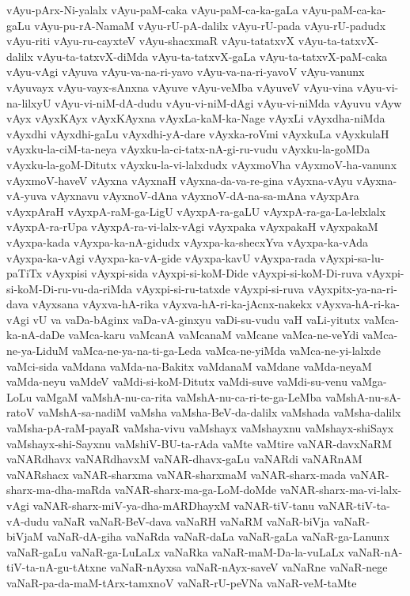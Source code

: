 {vAyu-pArx-Ni-yalalx
vAyu-paM-caka
vAyu-paM-ca-ka-gaLa
vAyu-paM-ca-ka-gaLu
vAyu-pu-rA-NamaM
vAyu-rU-pA-dalilx
vAyu-rU-pada
vAyu-rU-padudx
vAyu-riti
vAyu-ru-cayxteV
vAyu-shacxmaR
vAyu-tatatxvX
vAyu-ta-tatxvX-dalilx
vAyu-ta-tatxvX-diMda
vAyu-ta-tatxvX-gaLa
vAyu-ta-tatxvX-paM-caka
vAyu-vAgi
vAyuva
vAyu-va-na-ri-yavo
vAyu-va-na-ri-yavoV
vAyu-vanunx
vAyuvayx
vAyu-vayx-sAnxna
vAyuve
vAyu-veMba
vAyuveV
vAyu-vina
vAyu-vi-na-lilxyU
vAyu-vi-niM-dA-dudu
vAyu-vi-niM-dAgi
vAyu-vi-niMda
vAyuvu
vAyw
vAyx
vAyxKAyx
vAyxKAyxna
vAyxLa-kaM-ka-Nage
vAyxLi
vAyxdha-niMda
vAyxdhi
vAyxdhi-gaLu
vAyxdhi-yA-dare
vAyxka-roVmi
vAyxkuLa
vAyxkulaH
vAyxku-la-ciM-ta-neya
vAyxku-la-ci-tatx-nA-gi-ru-vudu
vAyxku-la-goMDa
vAyxku-la-goM-Ditutx
vAyxku-la-vi-lalxdudx
vAyxmoVha
vAyxmoV-ha-vanunx
vAyxmoV-haveV
vAyxna
vAyxnaH
vAyxna-da-va-re-gina
vAyxna-vAyu
vAyxna-vA-yuva
vAyxnavu
vAyxnoV-dAna
vAyxnoV-dA-na-sa-mAna
vAyxpAra
vAyxpAraH
vAyxpA-raM-ga-LigU
vAyxpA-ra-gaLU
vAyxpA-ra-ga-La-lelxlalx
vAyxpA-ra-rUpa
vAyxpA-ra-vi-lalx-vAgi
vAyxpaka
vAyxpakaH
vAyxpakaM
vAyxpa-kada
vAyxpa-ka-nA-gidudx
vAyxpa-ka-shecxYva
vAyxpa-ka-vAda
vAyxpa-ka-vAgi
vAyxpa-ka-vA-gide
vAyxpa-kavU
vAyxpa-rada
vAyxpi-sa-lu-paTiTx
vAyxpisi
vAyxpi-sida
vAyxpi-si-koM-Dide
vAyxpi-si-koM-Di-ruva
vAyxpi-si-koM-Di-ru-vu-da-riMda
vAyxpi-si-ru-tatxde
vAyxpi-si-ruva
vAyxpitx-ya-na-ri-dava
vAyxsana
vAyxva-hA-rika
vAyxva-hA-ri-ka-jAcnx-nakekx
vAyxva-hA-ri-ka-vAgi
vU
va
vaDa-bAginx
vaDa-vA-ginxyu
vaDi-su-vudu
vaH
vaLi-yitutx
vaMca-ka-nA-daDe
vaMca-karu
vaMcanA
vaMcanaM
vaMcane
vaMca-ne-veYdi
vaMca-ne-ya-LiduM
vaMca-ne-ya-na-ti-ga-Leda
vaMca-ne-yiMda
vaMca-ne-yi-lalxde
vaMci-sida
vaMdana
vaMda-na-Bakitx
vaMdanaM
vaMdane
vaMda-neyaM
vaMda-neyu
vaMdeV
vaMdi-si-koM-Ditutx
vaMdi-suve
vaMdi-su-venu
vaMga-LoLu
vaMgaM
vaMshA-nu-ca-rita
vaMshA-nu-ca-ri-te-ga-LeMba
vaMshA-nu-sA-ratoV
vaMshA-sa-nadiM
vaMsha
vaMsha-BeV-da-dalilx
vaMshada
vaMsha-dalilx
vaMsha-pA-raM-payaR
vaMsha-vivu
vaMshayx
vaMshayxnu
vaMshayx-shiSayx
vaMshayx-shi-Sayxnu
vaMshiV-BU-ta-rAda
vaMte
vaMtire
vaNAR-davxNaRM
vaNARdhavx
vaNARdhavxM
vaNAR-dhavx-gaLu
vaNARdi
vaNARnAM
vaNARshacx
vaNAR-sharxma
vaNAR-sharxmaM
vaNAR-sharx-mada
vaNAR-sharx-ma-dha-maRda
vaNAR-sharx-ma-ga-LoM-doMde
vaNAR-sharx-ma-vi-lalx-vAgi
vaNAR-sharx-miV-ya-dha-mARDhayxM
vaNAR-tiV-tanu
vaNAR-tiV-ta-vA-dudu
vaNaR
vaNaR-BeV-dava
vaNaRH
vaNaRM
vaNaR-biVja
vaNaR-biVjaM
vaNaR-dA-giha
vaNaRda
vaNaR-daLa
vaNaR-gaLa
vaNaR-ga-Lanunx
vaNaR-gaLu
vaNaR-ga-LuLaLx
vaNaRka
vaNaR-maM-Da-la-vuLaLx
vaNaR-nA-tiV-ta-nA-gu-tAtxne
vaNaR-nAyxsa
vaNaR-nAyx-saveV
vaNaRne
vaNaR-nege
vaNaR-pa-da-maM-tArx-tamxnoV
vaNaR-rU-peVNa
vaNaR-veM-taMte
}
